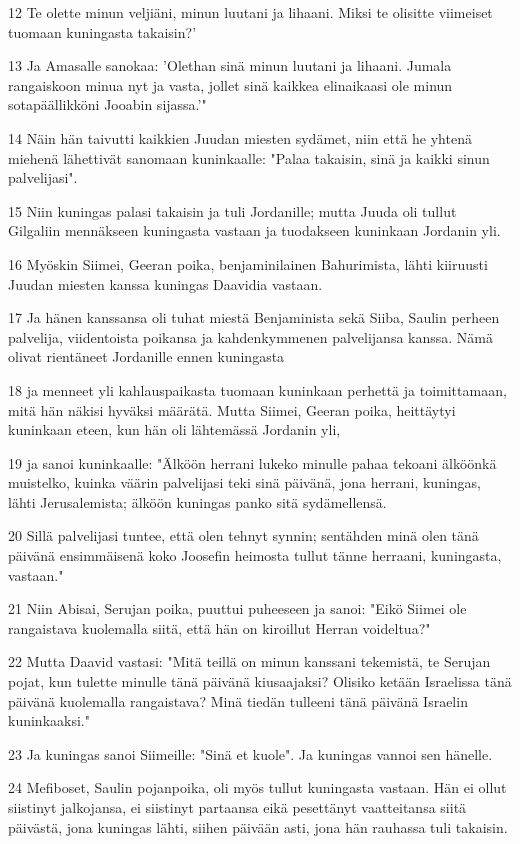 \par 12 Te olette minun veljiäni, minun luutani ja lihaani. Miksi te olisitte viimeiset tuomaan kuningasta takaisin?'
\par 13 Ja Amasalle sanokaa: 'Olethan sinä minun luutani ja lihaani. Jumala rangaiskoon minua nyt ja vasta, jollet sinä kaikkea elinaikaasi ole minun sotapäällikköni Jooabin sijassa.'"
\par 14 Näin hän taivutti kaikkien Juudan miesten sydämet, niin että he yhtenä miehenä lähettivät sanomaan kuninkaalle: "Palaa takaisin, sinä ja kaikki sinun palvelijasi".
\par 15 Niin kuningas palasi takaisin ja tuli Jordanille; mutta Juuda oli tullut Gilgaliin mennäkseen kuningasta vastaan ja tuodakseen kuninkaan Jordanin yli.
\par 16 Myöskin Siimei, Geeran poika, benjaminilainen Bahurimista, lähti kiiruusti Juudan miesten kanssa kuningas Daavidia vastaan.
\par 17 Ja hänen kanssansa oli tuhat miestä Benjaminista sekä Siiba, Saulin perheen palvelija, viidentoista poikansa ja kahdenkymmenen palvelijansa kanssa. Nämä olivat rientäneet Jordanille ennen kuningasta
\par 18 ja menneet yli kahlauspaikasta tuomaan kuninkaan perhettä ja toimittamaan, mitä hän näkisi hyväksi määrätä. Mutta Siimei, Geeran poika, heittäytyi kuninkaan eteen, kun hän oli lähtemässä Jordanin yli,
\par 19 ja sanoi kuninkaalle: "Älköön herrani lukeko minulle pahaa tekoani älköönkä muistelko, kuinka väärin palvelijasi teki sinä päivänä, jona herrani, kuningas, lähti Jerusalemista; älköön kuningas panko sitä sydämellensä.
\par 20 Sillä palvelijasi tuntee, että olen tehnyt synnin; sentähden minä olen tänä päivänä ensimmäisenä koko Joosefin heimosta tullut tänne herraani, kuningasta, vastaan."
\par 21 Niin Abisai, Serujan poika, puuttui puheeseen ja sanoi: "Eikö Siimei ole rangaistava kuolemalla siitä, että hän on kiroillut Herran voideltua?"
\par 22 Mutta Daavid vastasi: "Mitä teillä on minun kanssani tekemistä, te Serujan pojat, kun tulette minulle tänä päivänä kiusaajaksi? Olisiko ketään Israelissa tänä päivänä kuolemalla rangaistava? Minä tiedän tulleeni tänä päivänä Israelin kuninkaaksi."
\par 23 Ja kuningas sanoi Siimeille: "Sinä et kuole". Ja kuningas vannoi sen hänelle.
\par 24 Mefiboset, Saulin pojanpoika, oli myös tullut kuningasta vastaan. Hän ei ollut siistinyt jalkojansa, ei siistinyt partaansa eikä pesettänyt vaatteitansa siitä päivästä, jona kuningas lähti, siihen päivään asti, jona hän rauhassa tuli takaisin.
